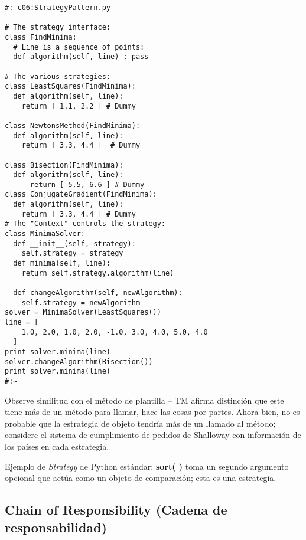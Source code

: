 \begin{lstlisting} 
#: c06:StrategyPattern.py 

# The strategy interface: 
class FindMinima: 
  # Line is a sequence of points: 
  def algorithm(self, line) : pass 
  
# The various strategies: 
class LeastSquares(FindMinima): 
  def algorithm(self, line): 
    return [ 1.1, 2.2 ] # Dummy 
    
class NewtonsMethod(FindMinima): 
  def algorithm(self, line): 
    return [ 3.3, 4.4 ]  # Dummy 
    
class Bisection(FindMinima): 
  def algorithm(self, line): 
      return [ 5.5, 6.6 ] # Dummy 
class ConjugateGradient(FindMinima): 
  def algorithm(self, line): 
    return [ 3.3, 4.4 ] # Dummy 
# The "Context" controls the strategy: 
class MinimaSolver: 
  def __init__(self, strategy): 
    self.strategy = strategy 
  def minima(self, line): 
    return self.strategy.algorithm(line) 
    
  def changeAlgorithm(self, newAlgorithm): 
    self.strategy = newAlgorithm 
solver = MinimaSolver(LeastSquares()) 
line = [ 
    1.0, 2.0, 1.0, 2.0, -1.0, 3.0, 4.0, 5.0, 4.0  
  ] 
print solver.minima(line) 
solver.changeAlgorithm(Bisection()) 
print solver.minima(line) 
#:~ 
\end{lstlisting}

Observe similitud con el método de plantilla  – TM afirma distinción que este tiene más de un método para llamar, hace las cosas por partes. Ahora bien, no es probable que la estrategia de objeto tendría más de un llamado al método; considere el sistema de cumplimiento de pedidos de Shalloway con información de los países en cada estrategia.  \newline

Ejemplo de \textit{Strategy} de Python estándar: \textbf{sort( )} toma un segundo argumento opcional que actúa como un objeto de comparación; esta es una estrategia.    \newpage


\subsection*{Chain of Responsibility (Cadena de responsabilidad)}
\label{subsec:cdr}

